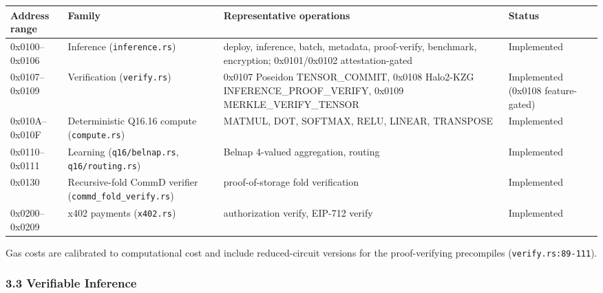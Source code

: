 {\def\LTcaptype{none} %
\begin{longtable}[]{@{}
  >{\raggedright\arraybackslash}p{}
  >{\raggedright\arraybackslash}p{}
  >{\raggedright\arraybackslash}p{}
  >{\raggedright\arraybackslash}p{}@{}}
\toprule\noalign{}
\begin{minipage}[b]{\linewidth}\raggedright
Address range
\end{minipage} & \begin{minipage}[b]{\linewidth}\raggedright
Family
\end{minipage} & \begin{minipage}[b]{\linewidth}\raggedright
Representative operations
\end{minipage} & \begin{minipage}[b]{\linewidth}\raggedright
Status
\end{minipage} \\
\midrule\noalign{}
\endhead
\bottomrule\noalign{}
\endlastfoot
0x0100--0x0106 & Inference (\texttt{inference.rs}) & deploy, inference,
batch, metadata, proof-verify, benchmark, encryption; 0x0101/0x0102
attestation-gated & Implemented \\
0x0107--0x0109 & Verification (\texttt{verify.rs}) & 0x0107 Poseidon
TENSOR\_COMMIT, 0x0108 Halo2-KZG INFERENCE\_PROOF\_VERIFY, 0x0109
MERKLE\_VERIFY\_TENSOR & Implemented (0x0108 feature-gated) \\
0x010A--0x010F & Deterministic Q16.16 compute (\texttt{compute.rs}) &
MATMUL, DOT, SOFTMAX, RELU, LINEAR, TRANSPOSE & Implemented \\
0x0110--0x0111 & Learning (\texttt{q16/belnap.rs},
\texttt{q16/routing.rs}) & Belnap 4-valued aggregation, routing &
Implemented \\
0x0130 & Recursive-fold CommD verifier (\texttt{commd\_fold\_verify.rs})
& proof-of-storage fold verification & Implemented \\
0x0200--0x0209 & x402 payments (\texttt{x402.rs}) & authorization
verify, EIP-712 verify & Implemented \\
\end{longtable}
}

Gas costs are calibrated to computational cost and include
reduced-circuit versions for the proof-verifying precompiles
(\texttt{verify.rs:89-111}).

\subsubsection{3.3 Verifiable Inference}\label{verifiable-inference}

